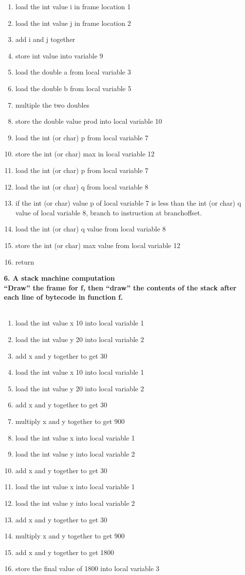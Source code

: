 \documentclass{article}
\begin{document}
\begin{enumerate}
\item load the int value i in frame location 1
\item load the int value j in frame location 2
\item add i and j together
\item store int value into variable 9
\item load the double a from local variable 3
\item load the double b from local variable 5
\item multiple the two doubles
\item store the double value prod into local variable 10
\item load the int (or char) p from local variable 7
\item store the int (or char) max  in local variable 12
\item load the int (or char) p from local variable 7
\item load the int (or char) q from local variable 8
\item if the int (or char) value p of local variable 7 is less than the int (or char) q value of local variable 8, branch to instruction at branchoffset.
\item load the int (or char) q value from local variable 8
\item store the int (or char) max value from local variable 12
\item return
\end{enumerate}
\textbf{6. A stack machine computation}
\\
\textbf{``Draw'' the frame for f, then ``draw'' the contents of the stack after each line of bytecode in function f.}
\\
\\
\begin{enumerate}
\item load the int value x 10 into local variable 1
\item load the int value y 20 into local variable 2
\item add x and y together to get 30
\item load the int value x 10 into local variable 1
\item load the int value y 20 into local variable 2
\item add x and y together to get 30
\item multiply x and y together to get 900
\item load the int value x into local variable 1
\item load the int value y into local variable 2
\item add x and y together to get 30
\item load the int value x into local variable 1
\item load the int value y into local variable 2
\item add x and y together to get 30
\item multiply x and y together to get 900
\item add x and y together to get 1800
\item store the final value of 1800 into local variable 3
\end{enumerate}
\end{document}
